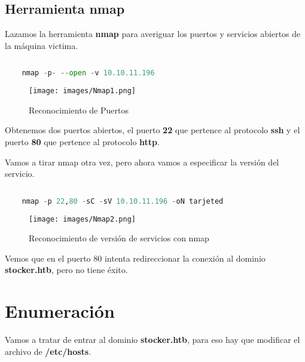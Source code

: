 \documentclass[a4paper]{article} %
\begin{document}
    \subsection{Herramienta nmap}
    Lazamos la herramienta \textbf{nmap} para averiguar los puertos y servicios abiertos de la máquina victima.
    \begin{lstlisting}[language=Python, caption=Primer lanzamiento de la herramienta en nmap]
         
    nmap -p- --open -v 10.10.11.196
    \end{lstlisting}

    \begin{figure}[h] %
        \centering
        \texttt{[image: images/Nmap1.png]}
        \caption{Reconocimiento de Puertos} %
    \end{figure} 

    Obtenemos dos puertos abiertos, el puerto {\textbf{\color{blue}22}} que pertence al protocolo \textbf{ssh} y el puerto {\textbf{\color{red}80}} que pertence al protocolo \textbf{http}.

    Vamos a tirar nmap otra vez, pero ahora vamos a especificar la versión del servicio.

    \vspace{1cm}

    \begin{lstlisting}[language=Python, caption=Segundo lanzamiento de la herramienta en nmap]
         
    nmap -p 22,80 -sC -sV 10.10.11.196 -oN tarjeted
    \end{lstlisting}

    \begin{figure}[h] %
        \centering
        \texttt{[image: images/Nmap2.png]}
        \caption{Reconocimiento de versión de servicios con nmap} %
    \end{figure} 

    Vemos que en el puerto 80 intenta redireccionar la conexión al dominio \textbf{stocker.htb}, pero no tiene éxito.

\section{Enumeración}

    Vamos a tratar de entrar al dominio {\textbf{\color{violet}stocker.htb}}, para eso hay que modificar el archivo de \textbf{/etc/hosts}.
\end{document}
